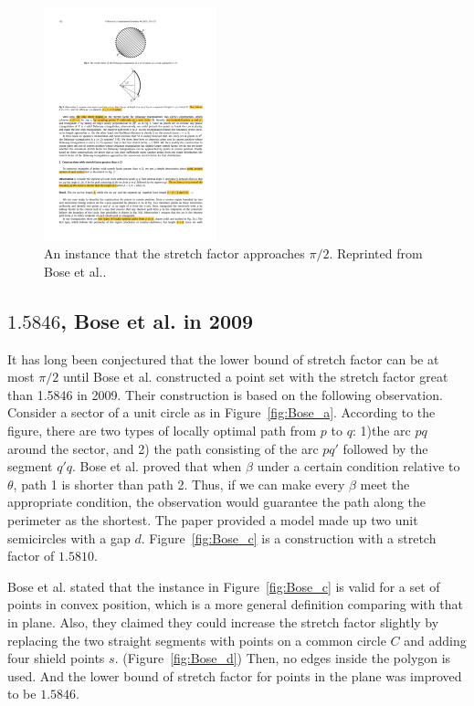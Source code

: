 \begin{figure}[ht]
\centering
\includegraphics[width=50mm]{Figures/pi:2.pdf}
\caption[An instance that the stretch factor approaches $\pi/2$]{An instance that the stretch factor approaches $\pi/2$. Reprinted from Bose et al.\cite{BoseCGTA}.} 
\label{fig:pi:2}
\end{figure}









\subsection{\texorpdfstring{$1.5846$}{Lg}, Bose et al. in 2009}
It has long been conjectured that the lower bound of stretch factor can be at most $\pi/2$ until Bose et al. \cite{BoseCGTA} constructed a point set with the  stretch factor great than 1.5846 in 2009.
Their construction is based on the following  observation. Consider a sector of a unit circle as in Figure~\ref{fig:Bose_a}. According to the figure, there are two types of locally optimal path from $p$ to $q$: 1)the arc $pq$  around the sector, and 2) the path consisting of the arc $pq'$ followed by the segment $q'q$. Bose et al. proved that when $\beta$ under a certain condition relative to $\theta$,  path 1 is shorter than path 2. Thus, if we can make every $\beta$ meet the appropriate condition, the observation would guarantee the path along the perimeter as the shortest. The paper provided a model made up two unit semicircles with a gap $d$. Figure~\ref{fig:Bose_c} is a construction with a stretch factor of $1.5810$. 

Bose et al. stated that  the instance in Figure~\ref{fig:Bose_c} is valid for a set of points in convex position, which is a more general definition comparing with that in plane. Also,  they claimed they could increase the stretch factor slightly by replacing the two straight segments with points on a common circle $C$ and adding four shield points $s$. (Figure~\ref{fig:Bose_d}) Then, no edges inside the polygon is used. And the lower bound of stretch factor for points in the plane was improved to be $1.5846$.



